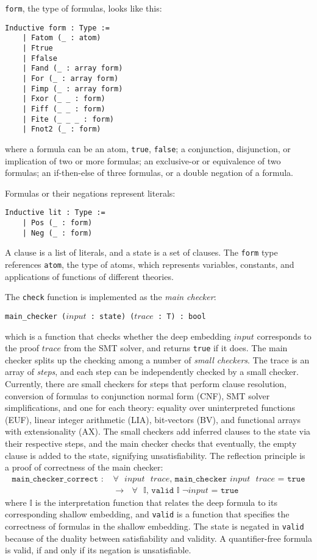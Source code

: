 \documentclass{article}
\begin{document}
	\texttt{form}, the type of 
	formulas, looks like this:
	\begin{verbatim}
Inductive form : Type :=
	| Fatom (_ : atom)
	| Ftrue
	| Ffalse
	| Fand (_ : array form)
	| For (_ : array form)
	| Fimp (_ : array form)
	| Fxor (_ _ : form)
	| Fiff (_ _ : form)
	| Fite (_ _ _ : form)
	| Fnot2 (_ : form)
	\end{verbatim}
	where a formula can be an atom, 
	\texttt{true}, \texttt{false};
	a conjunction, disjunction, or 
	implication of two or more 
	formulas; an exclusive-or or
	equivalence of two formulas; 
	an if-then-else of three formulas, 
	or a double negation of a formula.
	
	Formulas or their negations 
	represent literals:
	\begin{verbatim}
Inductive lit : Type :=
	| Pos (_ : form)
	| Neg (_ : form)
	\end{verbatim}
	A clause is a list of literals,
	and a state is a set of clauses.
	The \texttt{form} type references 
	\texttt{atom}, the type of atoms, 
	which represents variables, 
	constants, and applications of 
	functions of different theories.
	
	\noindent The \texttt{check} 
	function is implemented as the 
	\textit{main checker}: 
	\begin{center}
		\texttt{main\_checker ($input$ : 
			state) ($trace$ : T) : bool}	
	\end{center}
	which is a function that checks 
	whether the deep embedding $input$
	corresponds to the proof 
	$trace$ from the SMT solver, 
	and returns \texttt{true} if it 
	does. The main checker splits up 
	the checking among a number of 
	\textit{small checkers}. The 
	trace is an array of \textit{steps}, 
	and each step can be independently 
	checked by a small checker. Currently, 
	there are small checkers for steps 
	that perform clause resolution, 
	conversion of formulas to conjunction 
	normal form (CNF), SMT solver 
	simplifications, and one for each 
	theory:	equality over uninterpreted 
	functions (EUF), linear integer 
	arithmetic (LIA), bit-vectors (BV), 
	and functional arrays with 
	extensionality (AX). The small
	checkers add inferred clauses to 
	the state via their respective 
	steps, and the main checker 
	checks that eventually, the empty 
	clause is added to the state, 
	signifying unsatisfiability. The 
	reflection principle is a proof of 
	correctness of the main checker:
	\begin{align*}
		\texttt{main\_checker\_correct
		: } &\texttt{$\forall$ $input$ 
		$trace$, main\_checker $input$ 
		$trace$ = true}\\
		&\texttt{$\to$ $\forall$ 
		$\mathbb{I}$,
		valid $\mathbb{I}$
		$\neg input$ = true}
	\end{align*}
	where $\mathbb{I}$ is the 
	interpretation function that 
	relates the deep formula to its 
	corresponding shallow embedding,
	and \texttt{valid} is a function 
	that specifies the correctness
	of formulas in the shallow 
	embedding. The state is 
	negated in \texttt{valid} because 
	of the duality between 
	satisfiability and validity. A
	quantifier-free formula is valid, 
	if and only if its negation 
	is unsatisfiable. 
	
\end{document}
